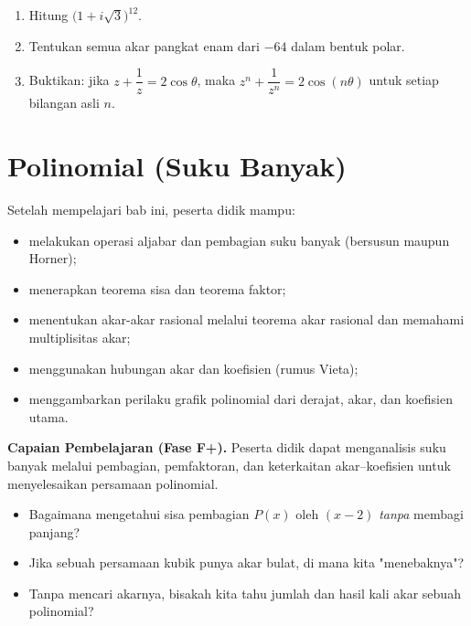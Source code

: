 \documentclass[11pt,a4paper]{report}
\theoremstyle{gaya}
\begin{document}
\begin{challenge}
\begin{enumerate}[leftmargin=*,topsep=2pt]
  \item Hitung $\big(1+i\sqrt3\big)^{12}$.
  \item Tentukan semua akar pangkat enam dari $-64$ dalam bentuk polar.
  \item Buktikan: jika $z+\dfrac1z=2\cos\theta$, maka $z^n+\dfrac{1}{z^n}=2\cos(n\theta)$ untuk setiap bilangan asli $n$.
\end{enumerate}
\end{challenge}

\chapter{Polinomial (Suku Banyak)}
\begin{tujuan}
Setelah mempelajari bab ini, peserta didik mampu:
\begin{itemize}[leftmargin=*,topsep=2pt]
  \item melakukan operasi aljabar dan pembagian suku banyak (bersusun maupun Horner);
  \item menerapkan teorema sisa dan teorema faktor;
  \item menentukan akar-akar rasional melalui teorema akar rasional dan memahami multiplisitas akar;
  \item menggunakan hubungan akar dan koefisien (rumus Vieta);
  \item menggambarkan perilaku grafik polinomial dari derajat, akar, dan koefisien utama.
\end{itemize}
\textbf{Capaian Pembelajaran (Fase F+).} Peserta didik dapat menganalisis suku banyak melalui pembagian, pemfaktoran, dan keterkaitan akar--koefisien untuk menyelesaikan persamaan polinomial.
\end{tujuan}

\begin{pemantik}
\begin{itemize}[leftmargin=*,topsep=2pt]
  \item Bagaimana mengetahui sisa pembagian $P(x)$ oleh $(x-2)$ \emph{tanpa} membagi panjang?
  \item Jika sebuah persamaan kubik punya akar bulat, di mana kita "menebaknya"?
  \item Tanpa mencari akarnya, bisakah kita tahu jumlah dan hasil kali akar sebuah polinomial?
\end{itemize}
\end{pemantik}
\end{document}
